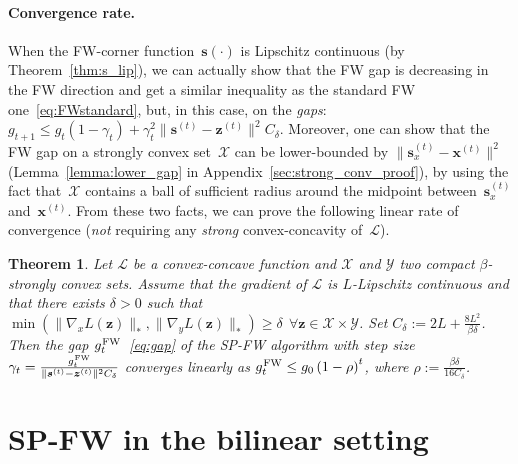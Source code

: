 \documentclass[twoside]{article}
\renewcommand{\L}{\mathcal{L}}
\newcommand{\X}{\mathcal{X}}
\newcommand{\Y}{\mathcal{Y}}
\newcommand{\M}{\X \times \Y}
\newcommand{\x}{\bm{x}}
\newcommand{\z}{\bm{z}}
\newcommand{\s}{\bm{s}}
\newcommand{\zt}{\bm{z}^{(t)}}
\newcommand{\st}{\bm{s}^{(t)}}
\newcommand{\gap}{g_{t}}
\newtheorem{theorem}[definition]{Theorem}
\newcommand{\FW}{{\hspace{0.05em}\textnormal{FW}}}
\newcommand{\0}{\mathbf{0}} %
\begin{document}
  \paragraph{Convergence rate.} %
  \label{par:convergence_rate}
  When the FW-corner function~$\s(\cdot)$ is Lipschitz continuous (by Theorem~\ref{thm:s_lip}), we can actually show that the FW gap is decreasing in the FW direction and get a similar inequality as the standard FW one~\eqref{eq:FWstandard}, but, in this case, on the \emph{gaps}: $g_{t+1} \leq \gap (1- \gamma_t) + \gamma_t^2 \|\st - \zt \|^2 C_\delta$. 
  Moreover, one can show that the FW gap on a strongly convex set~$\X$ can be lower-bounded by $\|\s_x^{(t)} - \x^{(t)} \|^2$ (Lemma~\ref{lemma:lower_gap} in Appendix~\ref{sec:strong_conv_proof}), by using the fact that~$\X$ contains a ball of sufficient radius around the midpoint between~$\s_x^{(t)}$ and~$ \x^{(t)}$. 
  From these two facts, we can prove the following linear rate of convergence (\emph{not} requiring any \emph{strong} convex-concavity of~$\L$). 
    \begin{theorem}\label{thm:conv_strong}
     Let $\L$ be a convex-concave function and $\X$ and $\Y$ two compact $\beta$-strongly convex sets. 
     Assume that the gradient of  $\L$ is $L$-Lipschitz continuous and that there exists $\delta>0$ such that $\min(\|\nabla_{\!x} L(\z)\|_*, \|\nabla_{\!y} L(\z)\|_*) \geq \delta \;\, \forall \z \in \M$. Set $C_\delta := 2L + \frac{8L^2}{\beta \delta}$. 
     Then the gap $\gap^{\FW}$~\eqref{eq:gap} of the SP-FW algorithm with step size $\gamma_t = \tfrac{\gap^{\FW}}{\|\st-\zt\|^2 C_\delta}$
     converges linearly as $\gap^{\FW} \leq g_0 \left( 1- \rho \right)^{t}$,
    where $\rho :=  \tfrac{\beta \delta}{16 C_\delta}$.
    \end{theorem}



%
%
%







\section{SP-FW in the bilinear setting}\label{sec:bilinear}
\end{document}
